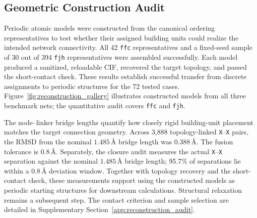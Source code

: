 \documentclass[a5paper, 10pt]{article}
\begin{document}
\subsection{Geometric Construction Audit}
\label{sec:reconstruction}

Periodic atomic models were constructed from the canonical ordering representatives to test whether their assigned building units could realize the intended network connectivity. All 42 \texttt{ffc} representatives and a fixed-seed sample of 30 out of 394 \texttt{fjh} representatives were assembled successfully. Each model produced a sanitized, reloadable CIF, recovered the target topology, and passed the short-contact check. These results establish successful transfer from discrete assignments to periodic structures for the 72 tested cases. Figure~\ref{fig:reconstruction_gallery} illustrates constructed models from all three benchmark nets; the quantitative audit covers \texttt{ffc} and \texttt{fjh}.

The node--linker bridge lengths quantify how closely rigid building-unit placement matches the target connection geometry. Across 3,888 topology-linked \texttt{X}--\texttt{X} pairs, the RMSD from the nominal $1.485$\,\AA{} bridge length was 0.388\,\AA{}. The fusion tolerance is 0.8\,\AA{}. Separately, the closure audit measures the actual \texttt{X}--\texttt{X} separation against the nominal $1.485$\,\AA{} bridge length; 95.7\% of separations lie within a 0.8\,\AA{} deviation window. Together with topology recovery and the short-contact check, these measurements support using the constructed models as periodic starting structures for downstream calculations. Structural relaxation remains a subsequent step. The contact criterion and sample selection are detailed in Supplementary Section~\ref{app:reconstruction_audit}.
\end{document}

